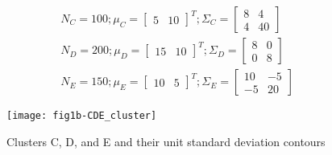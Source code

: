  \begin{eqnarray}
N_{C}=100; {\mu}_{C}=\left[ \begin{smallmatrix} 5&10 \end{smallmatrix}\right]^{T}; {\Sigma}_{C}=\left[ \begin{smallmatrix} 8&4 \\ 4&40 \end{smallmatrix}\right] \nonumber\\
N_{D}=200; {\mu}_{D}=\left[ \begin{smallmatrix} 15&10 \end{smallmatrix}\right]^{T}; {\Sigma}_{D}=\left[ \begin{smallmatrix} 8&0 \\ 0&8 \end{smallmatrix}\right] \nonumber\\
N_{E}=150; {\mu}_{E}=\left[ \begin{smallmatrix} 10&5 \end{smallmatrix}\right]^{T}; {\Sigma}_{E}=\left[ \begin{smallmatrix} 10&-5 \\ -5&20 \end{smallmatrix}\right] \nonumber
\end{eqnarray}
 
 
\begin{figure}[ht]
\centering
	\texttt{[image: fig1b-CDE\_cluster]}
	\label{fig:clustersDataCDE}
	\caption{Clusters C, D, and E and their unit standard deviation contours}
\end{figure}
 
\clearpage
